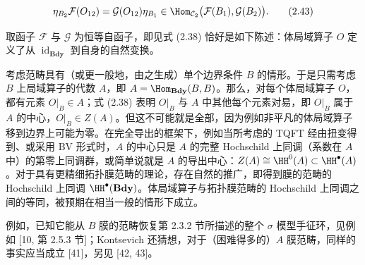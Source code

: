 \begin{equation}
\eta_{B_2}\mathcal{F}(O_{12}) = \mathcal{G}(O_{12})\eta_{B_1}\in\Hom_{\mathcal{C}_2}\bigl(\mathcal{F}(B_1),\mathcal{G}(B_2)\bigr).
\tag{2.43}
\end{equation}

取函子 $\mathcal{F}$ 与 $\mathcal{G}$ 为恒等自函子，即见式 (2.38) 恰好是如下陈述：体局域算子 $O$ 定义了从 $\operatorname{id}_{\mathbf{Bdy}}$ 到自身的自然变换。

考虑范畴具有（或更一般地，由之生成）单个边界条件 $B$ 的情形。于是只需考虑 $B$ 上局域算子的代数 $A$，即 $A=\Hom_{\mathbf{Bdy}}(B,B)$。那么，对每个体局域算子 $O$，都有元素 $O|_B\in A$；式 (2.38) 表明 $O|_B$ 与 $A$ 中其他每个元素对易，即 $O|_B$ 属于 $A$ 的中心，$O|_B\in Z(A)$。但这不可能就是全部，因为例如非平凡的体局域算子移到边界上可能为零。在完全导出的框架下，例如当所考虑的 TQFT 经由扭变得到、或采用 BV 形式时，$A$ 的中心只是 $A$ 的完整 Hochschild 上同调（系数在 $A$ 中）的第零上同调群，或简单说就是 $A$ 的导出中心：$Z(A)\cong \HH^{0}(A)\subset\HH^{\bullet}(A)$。对于具有更精细拓扑膜范畴的理论，存在自然的推广，即得到膜的范畴的 Hochschild 上同调 $\HH^{\bullet}(\mathbf{Bdy})$。体局域算子与拓扑膜范畴的 Hochschild 上同调之间的等同，被预期在相当一般的情形下成立。

例如，已知它能从 $B$ 膜的范畴恢复第 2.3.2 节所描述的整个 $\sigma$ 模型手征环，见例如 [10, 第 2.5.3 节]；Kontsevich 还猜想，对于（困难得多的）$A$ 膜范畴，同样的事实应当成立 [41]，另见 [42, 43]。


